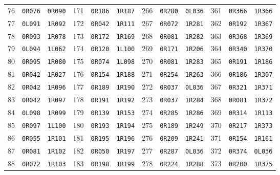 \documentclass[11pt,letterpaper]{article}
\begin{document}
\begin{longtable}{@{}rll@{\qquad}rll@{\qquad}rll@{\qquad}rll@{}}
76 & \texttt{0R076} & \texttt{0R090} & 171 & \texttt{0R186} & \texttt{1R187} & 266 & \texttt{0R280} & \texttt{0L036} & 361 & \texttt{0R366} & \texttt{1R366} \\
77 & \texttt{0L091} & \texttt{1R092} & 172 & \texttt{0R042} & \texttt{1R111} & 267 & \texttt{0R072} & \texttt{1R281} & 362 & \texttt{0R192} & \texttt{1R367} \\
78 & \texttt{0R093} & \texttt{1R078} & 173 & \texttt{0R172} & \texttt{1R169} & 268 & \texttt{0R081} & \texttt{1R282} & 363 & \texttt{0R368} & \texttt{1R369} \\
79 & \texttt{0L094} & \texttt{1L062} & 174 & \texttt{0R120} & \texttt{1L100} & 269 & \texttt{0R171} & \texttt{1R206} & 364 & \texttt{0R340} & \texttt{1R370} \\
80 & \texttt{0R095} & \texttt{1R080} & 175 & \texttt{0R074} & \texttt{1L098} & 270 & \texttt{0R081} & \texttt{1R283} & 365 & \texttt{0R191} & \texttt{1R186} \\
81 & \texttt{0R042} & \texttt{1R027} & 176 & \texttt{0R154} & \texttt{1R188} & 271 & \texttt{0R254} & \texttt{1R263} & 366 & \texttt{0R186} & \texttt{1R307} \\
82 & \texttt{0R042} & \texttt{1R096} & 177 & \texttt{0R189} & \texttt{1R190} & 272 & \texttt{0R037} & \texttt{0L036} & 367 & \texttt{0R321} & \texttt{1R371} \\
83 & \texttt{0R042} & \texttt{1R097} & 178 & \texttt{0R191} & \texttt{1R192} & 273 & \texttt{0R037} & \texttt{1R284} & 368 & \texttt{0R081} & \texttt{1R372} \\
84 & \texttt{0L098} & \texttt{1R099} & 179 & \texttt{0R139} & \texttt{1R153} & 274 & \texttt{0R285} & \texttt{1R286} & 369 & \texttt{0R314} & \texttt{1R113} \\
85 & \texttt{0R097} & \texttt{1L100} & 180 & \texttt{0R193} & \texttt{1R194} & 275 & \texttt{0R189} & \texttt{1R249} & 370 & \texttt{0R217} & \texttt{1R373} \\
86 & \texttt{0R055} & \texttt{1R101} & 181 & \texttt{0R195} & \texttt{1R196} & 276 & \texttt{0R209} & \texttt{1R241} & 371 & \texttt{0R154} & \texttt{1R161} \\
87 & \texttt{0R081} & \texttt{1R102} & 182 & \texttt{0R050} & \texttt{1R197} & 277 & \texttt{0R287} & \texttt{0L036} & 372 & \texttt{0R374} & \texttt{0L036} \\
88 & \texttt{0R072} & \texttt{1R103} & 183 & \texttt{0R198} & \texttt{1R199} & 278 & \texttt{0R224} & \texttt{1R288} & 373 & \texttt{0R200} & \texttt{1R375} \\

\end{longtable}
\end{document}
